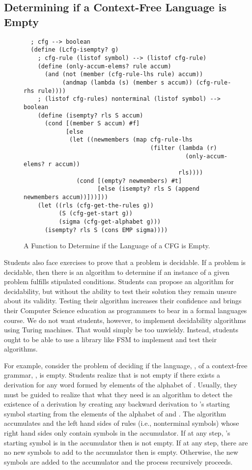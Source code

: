 \documentclass{eptcs}
\begin{document}
\subsection{Determining if a Context-Free Language is Empty}

\begin{figure}
\begin{verbatim}
  ; cfg --> boolean
  (define (Lcfg-isempty? g)
    ; cfg-rule (listof symbol) --> (listof cfg-rule)
    (define (only-accum-elems? rule accum)
      (and (not (member (cfg-rule-lhs rule) accum))
           (andmap (lambda (s) (member s accum)) (cfg-rule-rhs rule))))
    ; (listof cfg-rules) nonterminal (listof symbol) --> boolean
    (define (isempty? rls S accum)
      (cond [(member S accum) #f]
            [else
             (let ((newmembers (map cfg-rule-lhs
                                    (filter (lambda (r)
                                              (only-accum-elems? r accum))
                                            rls))))
               (cond [(empty? newmembers) #t]
                     [else (isempty? rls S (append newmembers accum))]))]))
    (let ((rls (cfg-get-the-rules g))
          (S (cfg-get-start g))
          (sigma (cfg-get-alphabet g)))
      (isempty? rls S (cons EMP sigma))))
\end{verbatim}
\caption{A Function to Determine if the Language of a CFG is Empty.}
\label{cfge}
\end{figure}

Students also face exercises to prove that a problem is decidable. If a problem is decidable, then there is an algorithm to determine if an instance of a given problem fulfills stipulated conditions. Students can propose an algorithm for decidability, but without the ability to test their solution they remain unsure about its validity. Testing their algorithm increases their confidence and brings their Computer Science education as programmers to bear in a formal languages course. We do not want students, however, to implement decidability algorithms using Turing machines. That would simply be too unwieldy. Instead, students ought to be able to use a library like \textsf{FSM} to implement and test their algorithms.

For example, consider the problem of deciding if the language, , of a context-free grammar, , is empty. Students realize that  is not empty if there exists a derivation for any word formed by elements of the alphabet of . Usually, they must be guided to realize that what they need is an algorithm to detect the existence of a derivation by creating any backward derivation to 's starting symbol starting from the elements of the alphabet of  and . The algorithm accumulates  and the left hand sides of rules (i.e., nonterminal symbols) whose right hand sides only contain symbols in the accumulator. If at any step, 's starting symbol is in the accumulator then  is not empty. If at any step, there are no new symbols to add to the accumulator then  is empty. Otherwise, the new symbols are added to the accumulator and the process recursively proceeds.
\end{document}

